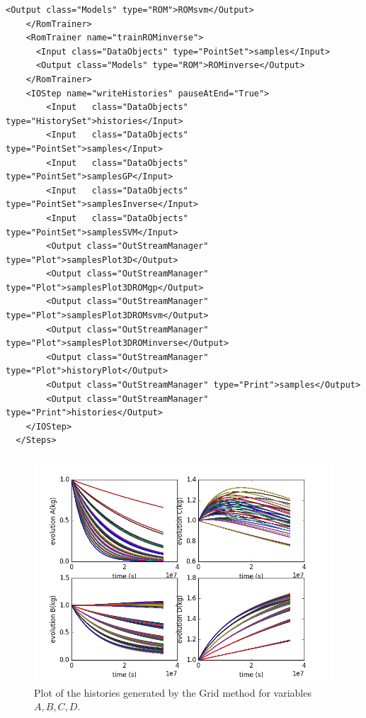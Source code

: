 \begin{enumerate}
\begin{lstlisting}[style=XML,morekeywords={arg,extension,pauseAtEnd,overwrite}]
      <Output class="Models" type="ROM">ROMsvm</Output>
    </RomTrainer>
    <RomTrainer name="trainROMinverse">
      <Input class="DataObjects" type="PointSet">samples</Input>
      <Output class="Models" type="ROM">ROMinverse</Output>
    </RomTrainer>
    <IOStep name="writeHistories" pauseAtEnd="True">
        <Input   class="DataObjects"      type="HistorySet">histories</Input>
        <Input   class="DataObjects"      type="PointSet">samples</Input>
        <Input   class="DataObjects"      type="PointSet">samplesGP</Input>
        <Input   class="DataObjects"      type="PointSet">samplesInverse</Input>
        <Input   class="DataObjects"      type="PointSet">samplesSVM</Input>
        <Output class="OutStreamManager" type="Plot">samplesPlot3D</Output>
        <Output class="OutStreamManager" type="Plot">samplesPlot3DROMgp</Output>
        <Output class="OutStreamManager" type="Plot">samplesPlot3DROMsvm</Output>
        <Output class="OutStreamManager" type="Plot">samplesPlot3DROMinverse</Output>
        <Output class="OutStreamManager" type="Plot">historyPlot</Output>
        <Output class="OutStreamManager" type="Print">samples</Output>
        <Output class="OutStreamManager" type="Print">histories</Output>
    </IOStep>
  </Steps>
\end{lstlisting}
 \begin{figure}[h!]
  \centering
  \includegraphics[scale=0.7]{pics/reducedOrderModelingHistoriesPhysicalModel.png}
  \caption{Plot of the histories generated by the Grid method for variables $A,B,C,D$.}
  \label{fig:ROMgrid_histories}

\end{figure}
\end{enumerate}
